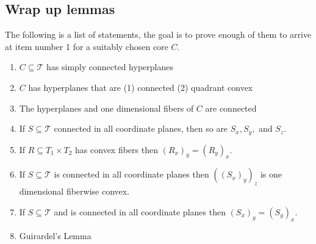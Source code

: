 \documentclass{article}
\newcommand{\sxyz}{((S_x)_y)_z}
\theoremstyle{mystyle}
\theoremstyle{remark}
\begin{document}
\subsection{Wrap up lemmas}
The following is a list of statements, the goal is to prove enough of them to arrive at item number 1 for a suitably chosen core \(C\).
\begin{enumerate}
    \item \(C \subseteq \mathscr{T}\) has simply connected hyperplanes
    \item \(C\) has hyperplanes that are (1) connected (2) quadrant convex
    \item The hyperplanes and one dimensional fibers of \(C\) are connected
    \item If \(S \subseteq \mathscr{T}\) connected in all coordinate planes, then so are \(S_{x}, S_{y},\) and \(S_{z}\).
    \item If \(R \subseteq T_{1} \times T_{2}\) has convex fibers then \( \left( R_{x} \right)_{y} = \left( R_{y} \right)_{x}\).
    \item If \(S \subseteq \mathscr{T}\) is connected in all coordinate planes then \(\sxyz\) is one dimensional fiberwise convex. 
    \item \label{state:7} If \(S \subseteq \mathscr{T}\) and is connected in all coordinate planes then \( \left( S_{x} \right)_{y} = \left( S_{y} \right)_{x}\).
    \item Guirardel's Lemma
\end{enumerate}
\end{document}
